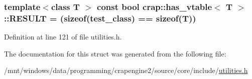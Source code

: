 \subsubsection[{R\+E\+S\+U\+L\+T}]{\setlength{\rightskip}{0pt plus 5cm}template$<$class T $>$ const bool {\bf crap\+::has\+\_\+vtable}$<$ T $>$\+::R\+E\+S\+U\+L\+T = (sizeof({\bf test\+\_\+class}) == sizeof(T))\hspace{0.3cm}{\ttfamily [static]}}\label{structcrap_1_1has__vtable_a020726388c42488ee23dc65f8e1b4b83}


Definition at line 121 of file utilities.\+h.



The documentation for this struct was generated from the following file\+:\begin{DoxyCompactItemize}
\item 
/mnt/windows/data/programming/crapengine2/source/core/include/\hyperlink{utilities_8h}{utilities.\+h}\end{DoxyCompactItemize}
